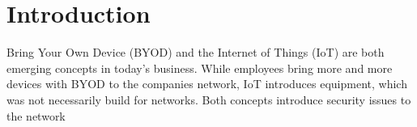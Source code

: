 \chapter{Introduction}
Bring Your Own Device (BYOD) and the Internet of Things (IoT) are both emerging concepts in today's business. While employees bring more and more devices with BYOD to the companies network, IoT introduces equipment, which was not necessarily build for networks. Both concepts introduce security issues to the network 